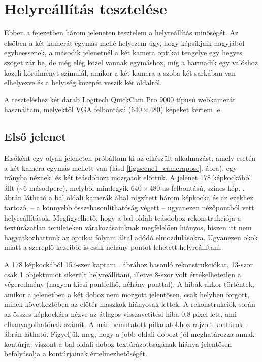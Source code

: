 \chapter{Helyreállítás tesztelése \label{chapter:full-test}}

Ebben a fejezetben három jeleneten tesztelem a helyreállítás minőségét. Az elsőben a két kamerát egymás mellé helyezem úgy, hogy képsíkjaik nagyjából egybeessenek, a második jelenetnél a két kamera optikai tengelye egy hegyes szöget zár be, de még elég közel vannak egymáshoz, míg a harmadik egy valóshoz közeli körülményt szimulál, amikor a két kamera a szoba két sarkában van elhelyezve és a helyiség közepét veszik két oldalról.

A teszteléshez két darab Logitech QuickCam Pro 9000 típusú webkamerát használtam, melyektől VGA felbontású ($640\times 480$) képeket kértem le.

\section{Első jelenet}

Elsőként egy olyan jeleneten próbáltam ki az elkészült alkalmazást, amely esetén a két kamera egymás mellett van (lásd \ref{fig:scene1_camerapose}. ábra), egy irányba néznek, és két teásdobozt mozgatok előttük. A jelenet 178 képkockából állt (\textasciitilde 6 másodperc), melyből mindegyik $640\times 480$-as felbontású, színes kép. . ábrán látható a bal oldali kamerák által rögzített három képkocka és az ezekhez tartozó, -- a könnyebb összehasonlíthatóság végett -- ugyanezen nézőpontból vett helyreállítások. Megfigyelhető, hogy a bal oldali teásdoboz rekonstrukciója a textúrázatlan területeken várakozásainknak megfelelően hiányos, hiszen itt nem hagyatkozhattunk az optikai folyam által adódó elmozdulásokra. Ugyanezen okok miatt a szereplő kezeiből is csak néhány pontot lehetett helyreállítani.

A 178 képkockából 157-szer kaptam . ábrához hasonló rekonstrukciókat, 13-szor csak 1 objektumot sikerült helyreállítani, illetve 8-szor volt értékelhetetlen a végeredmény (nagyon kicsi pontfelhő, néhány ponttal). A hibák akkor történtek, amikor a jelenetben a két doboz nem mozgott jelentősen, csak helyben forgott, minek következtében az előtér maszkok hiányosak lettek. A rekonstrukciók során az összes képkockára nézve az átlagos visszavetítési hiba 0,8 pixel lett, ami elhanyagolhatónak számít. A már bemutatott pillanatokhoz rajzolt kontúrok . ábrán látható. Figyeljük meg, hogy a jobb oldali dobozt jól meghatározza annak kontúrja, viszont a bal oldali doboz textúrázottságának hiánya jelentősen befolyásolja a kontúrjainak értelmezhetőségét.

